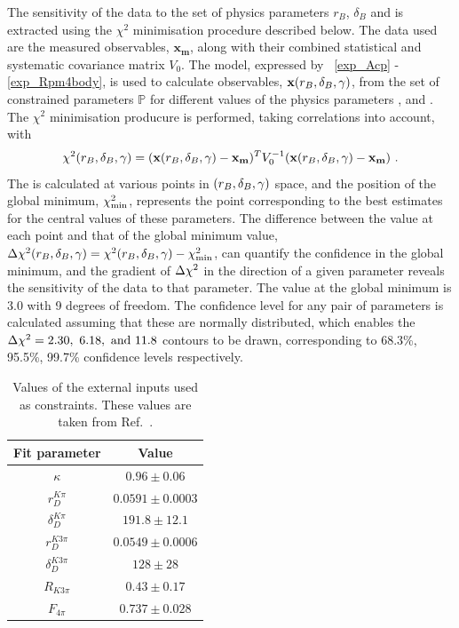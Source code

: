 The sensitivity of the data to the set of physics parameters $r_B$, $\delta_B$ and \Pgamma is extracted using the $\chi^2$ minimisation procedure described below. The data used are the measured \CP observables, $\mathbf{x_m}$, along with their combined statistical and systematic covariance matrix $V_0$. The model, expressed by \eqns~\ref{exp_Acp} - \ref{exp_Rpm4body}, is used to calculate \CP observables, $\mathbf{x}(r_B, \delta_B, \gamma)$, from the set of constrained parameters $\mathbb{P}$ for different values of the physics parameters \rb, \deltab and \Pgamma. The $\chi^2$ minimisation producure is performed, taking correlations into account, with
\begin{equation}
\chi^2(r_B, \delta_B, \gamma) = (\mathbf{x}(r_B, \delta_B, \gamma) - \mathbf{x_m})^TV_0^{-1}(\mathbf{x}(r_B, \delta_B, \gamma) - \mathbf{x_m}) \text{ .}
\end{equation}
The \chisq is calculated at various points in $\left(r_B, \delta_B, \gamma\right)$ space, and the position of the global minimum, $\chi^2_{\text{min}}$, represents the point corresponding to the best estimates for the central values of these parameters. The difference between the \chisq value at each point and that of the global minimum value, $\Delta\chi^2(r_B, \delta_B, \gamma) = \chi^2(r_B, \delta_B, \gamma) - \chi^2_{\text{min}}$, can quantify the confidence in the global minimum, and the gradient of $\Delta\chi^2$ in the direction of a given parameter reveals the sensitivity of the data to that parameter. The \chisq value at the global minimum is 3.0 with 9 degrees of freedom. The confidence level for any pair of parameters is calculated assuming that these are normally distributed, which enables the $\Delta\chi^2 = 2.30,\ 6.18,\ \text{and } 11.8$ contours to be drawn, corresponding to 68.3\%, 95.5\%,  99.7\% confidence levels respectively.

\begin{table}
\centering
\begin{tabular}{cc}
Fit parameter & Value \\
\hline
$\kappa$ & $0.96 \pm 0.06$ \\
$r_D^{K\pi}$ & $0.0591 \pm 0.0003$ \\
$\delta_D^{K\pi}$ & $191.8 \pm 12.1$ \\
$r_D^{K3\pi}$ & $0.0549 \pm 0.0006$ \\
$\delta_D^{K3\pi}$ & $128 \pm 28$ \\
$R_{K3\pi}$ & $0.43 \pm 0.17$ \\
$F_{4\pi}$ & $0.737 \pm 0.028$
\end{tabular}
\caption{Values of the external inputs used as constraints. These values are taken from Ref.~\cite{HFAG,charmk3pi,charmk3pi_errata,charm4pi}.}
\label{inputparameters}
\end{table}

